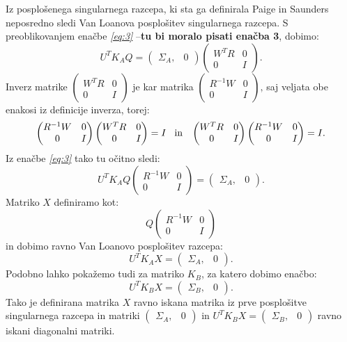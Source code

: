 \documentclass[mat1]{article}
\begin{document}
Iz posplošenega singularnega razcepa, ki sta ga definirala Paige in Saunders neposredno sledi Van Loanova posplošitev singularnega razcepa. 
S preoblikovanjem enačbe \textit{\eqref{eq:3}} --\textbf{tu bi moralo pisati enačba 3}, dobimo:
$$U^T K_A Q = \left(\begin{array}{cc} \Sigma_A, & 0 \end{array}\right)
\begin{pmatrix}
W^TR & 0 \\
0 & I 
\end{pmatrix} \text{.}$$
Inverz matrike
$\begin{pmatrix}
W^TR & 0 \\
0 & I 
\end{pmatrix} $
je kar matrika 
$\begin{pmatrix}
R^{-1} W & 0 \\
0 & I 
\end{pmatrix} \text{,}$
saj veljata obe enakosi iz definicije inverza, torej:
$$\begin{pmatrix}
R^{-1} W & 0 \\
0 & I 
\end{pmatrix}
\begin{pmatrix}
W^TR & 0 \\
0 & I 
\end{pmatrix}
= I \hspace{3mm}\text{in} \hspace{3mm}
\begin{pmatrix}
W^TR & 0 \\
0 & I 
\end{pmatrix}
\begin{pmatrix}
R^{-1} W & 0 \\
0 & I 
\end{pmatrix}
= I \text{.}$$
Iz enačbe \textit{\eqref{eq:3}} tako tu očitno sledi:
$$ U^T K_A Q
\begin{pmatrix}
R^{-1} W & 0 \\
0 & I 
\end{pmatrix}
=
\left(\begin{array}{cc} \Sigma_A, & 0 \end{array}\right) \text{.}
$$
Matriko $X$ definiramo kot:
$$ Q
\begin{pmatrix}
R^{-1} W & 0 \\
0 & I 
\end{pmatrix}
$$ in dobimo ravno Van Loanovo posplošitev razcepa:
$$ U^T K_A X = \left(\begin{array}{cc} \Sigma_A, & 0 \end{array}\right) \text{.}
$$
Podobno lahko pokažemo tudi za matriko $K_B$, za katero dobimo enačbo:
$$ U^T K_B X = \left(\begin{array}{cc} \Sigma_B, & 0 \end{array}\right) \text{.}
$$
Tako je definirana matrika $X$ ravno iskana matrika iz prve posplošitve singularnega razcepa in matriki $\left(\begin{array}{cc} \Sigma_A, & 0 \end{array}\right)$ in $ U^T K_B X = \left(\begin{array}{cc} \Sigma_B, & 0 \end{array}\right)$ ravno iskani diagonalni matriki.
\end{document}
